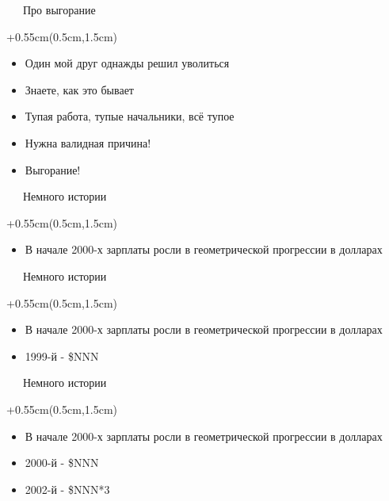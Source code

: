 \documentclass[xetex,18pt,aspectratio=169]{beamer}
\begin{document}
\begin{Large}
\begin{frame}{\ \ \ Про выгорание}
\begin{textblock*}{\framewidth+0.55cm}(0.5cm,1.5cm)
\begin{itemize}
  \item Один мой друг однажды решил уволиться
  \item Знаете, как это бывает
  \item Тупая работа, тупые начальники, всё тупое
  \item Нужна валидная причина!
  \item Выгорание!
\end{itemize}
\end{textblock*}
\end{frame}

\begin{frame}{\ \ \ Немного истории}
\begin{textblock*}{\framewidth+0.55cm}(0.5cm,1.5cm)
\begin{itemize}
  \item В начале 2000-х зарплаты росли в геометрической прогрессии в долларах
\end{itemize}
\end{textblock*}
\end{frame}

\begin{frame}{\ \ \ Немного истории}
\begin{textblock*}{\framewidth+0.55cm}(0.5cm,1.5cm)
\begin{itemize}
  \item В начале 2000-х зарплаты росли в геометрической прогрессии в долларах
  \item 1999-й - \$NNN
\end{itemize}
\end{textblock*}
\end{frame}

\begin{frame}{\ \ \ Немного истории}
\begin{textblock*}{\framewidth+0.55cm}(0.5cm,1.5cm)
\begin{itemize}
  \item В начале 2000-х зарплаты росли в геометрической прогрессии в долларах
  \item 2000-й - \$NNN
  \item 2002-й - \$NNN*3
\end{itemize}
\end{textblock*}
\end{frame}


\end{Large}
\end{document}
